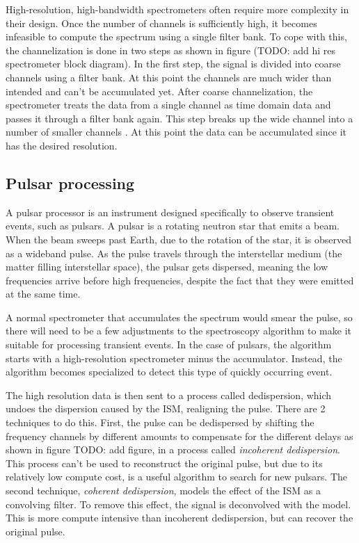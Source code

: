 High-resolution, high-bandwidth spectrometers often require more complexity in their design. 
Once the number of channels is sufficiently high, it becomes infeasible to compute the spectrum using a single filter bank. 
To cope with this, the channelization is done in two steps as shown in figure (TODO: add hi res spectrometer block diagram). 
In the first step, the signal is divided into coarse channels using a filter bank. 
At this point the channels are much wider than intended and can't be accumulated yet. 
After coarse channelization, the spectrometer treats the data from a single channel as time domain data and passes it through a filter bank again. 
This step breaks up the wide channel into a number of smaller channels . At this point the data can be accumulated since it has the desired resolution.

\subsection{Pulsar processing}
A pulsar processor is an instrument designed specifically to observe transient events, such as pulsars. 
A pulsar is a rotating neutron star that emits a beam. 
When the beam sweeps past Earth, due to the rotation of the star, it is observed as a wideband pulse. 
As the pulse travels through the interstellar medium (the matter filling interstellar space), the pulsar gets dispersed, meaning the low frequencies arrive before high frequencies, despite the fact that they were emitted at the same time. 

A normal spectrometer that accumulates the spectrum would smear the pulse, so there will need to be a few adjustments to the spectroscopy algorithm to make it suitable for processing transient events. 
In the case of pulsars, the algorithm starts with a high-resolution spectrometer minus the accumulator. 
Instead, the algorithm becomes specialized to detect this type of quickly occurring event.

The high resolution data is then sent to a process called dedispersion, which undoes the dispersion caused by the ISM, realigning the pulse.
There are 2 techniques to do this.
First, the pulse can be dedispersed by shifting the frequency channels by different amounts to compensate for the different delays as shown in figure TODO: add figure, in a process called \emph{incoherent dedispersion}.
This process can't be used to reconstruct the original pulse, but due to its relatively low compute cost, is a useful algorithm to search for new pulsars.
The second technique, \emph{coherent dedispersion}, models the effect of the ISM as a convolving filter. 
To remove this effect, the signal is deconvolved with the model.
This is more compute intensive than incoherent dedispersion, but can recover the original pulse.

